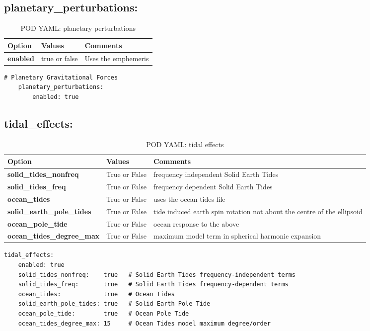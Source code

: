 \subsection{planetary\_perturbations:}
\begin{table}[h!]
	\begin{tabular}{|p{4.5cm}|p{2cm}|p{3.5cm}|}
		\hline
		Option & Values & Comments \\
		\hline
		\textbf{enabled} & true or false & Uses the emphemeris \\ %
		\hline
	\end{tabular}
	\caption{POD YAML: planetary perturbations}
	\label{table:pod_yaml_planet}
\end{table}  
%
\begin{lstlisting}[language=xml,caption=yaml example for planetary pertubations]
# Planetary Gravitational Forces
	planetary_perturbations:
		enabled: true	
\end{lstlisting}
%	
\subsection{tidal\_effects:}
\begin{table}[h!]
	\begin{tabular}{|p{4.5cm}|p{2cm}|p{3.5cm}|}
		\hline
		Option & Values & Comments \\
		\hline
		\textbf{solid\_tides\_nonfreq} & True or False & frequency independent Solid Earth Tides \\
		\textbf{solid\_tides\_freq} & True or False & frequency dependent Solid Earth Tides \\
		\textbf{ocean\_tides} & True or False & uses the ocean tides file \\
		\textbf{solid\_earth\_pole\_tides} & True or False & tide induced earth spin rotation not about the centre of the ellipsoid \\
		\textbf{ocean\_pole\_tide} & True or False & ocean response to the above \\
		\textbf{ocean\_tides\_degree\_max} & True or False & maximum model term in spherical harmonic expansion \\
		\hline
	\end{tabular}
	\caption{POD YAML: tidal effects}
	\label{table:pod_yaml_tidal_effects}
\end{table}
%
\begin{lstlisting}[language=xml,caption=yaml example for tidal effects]
  	tidal_effects:
	enabled: true
	solid_tides_nonfreq:    true   # Solid Earth Tides frequency-independent terms
	solid_tides_freq:       true   # Solid Earth Tides frequency-dependent terms
	ocean_tides:            true   # Ocean Tides
	solid_earth_pole_tides: true   # Solid Earth Pole Tide
	ocean_pole_tide:        true   # Ocean Pole Tide
	ocean_tides_degree_max: 15     # Ocean Tides model maximum degree/order	
\end{lstlisting}	
%
